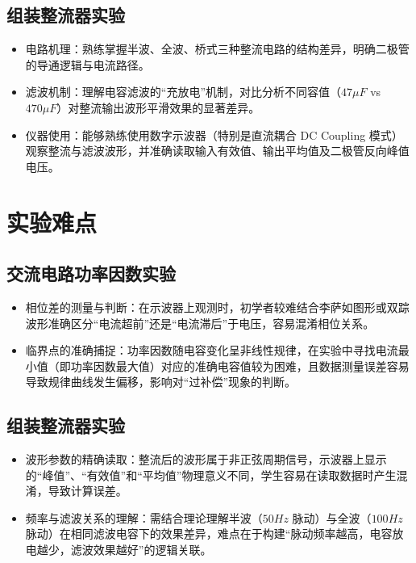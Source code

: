 \documentclass[]{../template/Report}%
\begin{document}
\subsection{组装整流器实验}
\begin{itemize}
    \item 电路机理：熟练掌握半波、全波、桥式三种整流电路的结构差异，明确二极管的导通逻辑与电流路径。
    \item 滤波机制：理解电容滤波的“充放电”机制，对比分析不同容值（$47\mu F$ vs $470\mu F$）对整流输出波形平滑效果的显著差异。
    \item 仪器使用：能够熟练使用数字示波器（特别是直流耦合 DC Coupling 模式）观察整流与滤波波形，并准确读取输入有效值、输出平均值及二极管反向峰值电压。
\end{itemize}

\section{实验难点}

\subsection{交流电路功率因数实验}
\begin{itemize}
    \item 相位差的测量与判断：在示波器上观测时，初学者较难结合李萨如图形或双踪波形准确区分“电流超前”还是“电流滞后”于电压，容易混淆相位关系。
    \item 临界点的准确捕捉：功率因数随电容变化呈非线性规律，在实验中寻找电流最小值（即功率因数最大值）对应的准确电容值较为困难，且数据测量误差容易导致规律曲线发生偏移，影响对“过补偿”现象的判断。
\end{itemize}

\subsection{组装整流器实验}
\begin{itemize}
    \item 波形参数的精确读取：整流后的波形属于非正弦周期信号，示波器上显示的“峰值”、“有效值”和“平均值”物理意义不同，学生容易在读取数据时产生混淆，导致计算误差。
    \item 频率与滤波关系的理解：需结合理论理解半波（$50Hz$ 脉动）与全波（$100Hz$ 脉动）在相同滤波电容下的效果差异，难点在于构建“脉动频率越高，电容放电越少，滤波效果越好”的逻辑关联。
\end{itemize}
\end{document}

